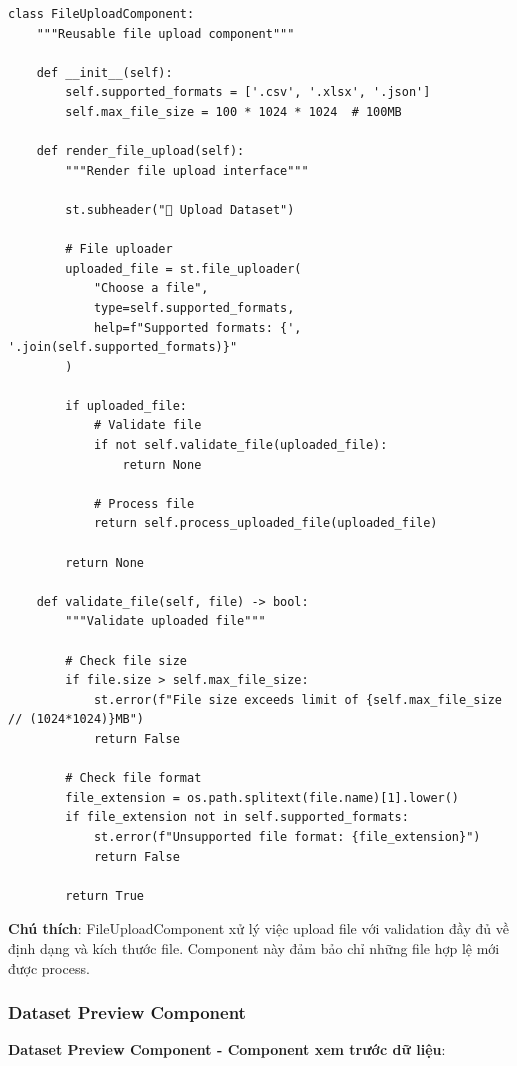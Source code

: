 \begin{verbatim}
class FileUploadComponent:
    """Reusable file upload component"""
    
    def __init__(self):
        self.supported_formats = ['.csv', '.xlsx', '.json']
        self.max_file_size = 100 * 1024 * 1024  # 100MB
        
    def render_file_upload(self):
        """Render file upload interface"""
        
        st.subheader("📁 Upload Dataset")
        
        # File uploader
        uploaded_file = st.file_uploader(
            "Choose a file",
            type=self.supported_formats,
            help=f"Supported formats: {', '.join(self.supported_formats)}"
        )
        
        if uploaded_file:
            # Validate file
            if not self.validate_file(uploaded_file):
                return None
                
            # Process file
            return self.process_uploaded_file(uploaded_file)
            
        return None
        
    def validate_file(self, file) -> bool:
        """Validate uploaded file"""
        
        # Check file size
        if file.size > self.max_file_size:
            st.error(f"File size exceeds limit of {self.max_file_size // (1024*1024)}MB")
            return False
            
        # Check file format
        file_extension = os.path.splitext(file.name)[1].lower()
        if file_extension not in self.supported_formats:
            st.error(f"Unsupported file format: {file_extension}")
            return False
            
        return True
\end{verbatim}

\textbf{Chú thích}: FileUploadComponent xử lý việc upload file với validation đầy đủ về định dạng và kích thước file. Component này đảm bảo chỉ những file hợp lệ mới được process.

\subsubsection{Dataset Preview Component}

\textbf{Dataset Preview Component - Component xem trước dữ liệu}:

